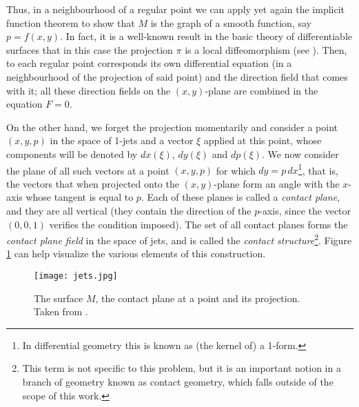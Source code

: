 Thus, in a neighbourhood of a regular point we can apply yet again the implicit function theorem to show that $M$ is the graph of a smooth function, say $p=f(x,y)$. In fact, it is a well-known result in the basic theory of differentiable surfaces that in this case the projection $\pi$ is a local diffeomorphism (see \cite[39]{montiel2009curves}). Then, to each regular point corresponds its own differential equation (in a neighbourhood of the projection of said point) and the direction field that comes with it; all these direction fields on the $(x,y)$-plane are combined in the equation $F=0$.

On the other hand, we forget the projection momentarily and consider a point $(x,y,p)$ in the space of 1-jets and a vector $\xi$ applied at this point, whose components will be denoted by $dx(\xi)$, $dy(\xi)$ and $dp(\xi)$. We now consider the plane of all such vectors at a point $(x,y,p)$ for which $dy=p\,dx$\footnote{In differential geometry this is known as (the kernel of) a 1-form.}, that is, the vectors that when projected onto the $(x,y)$-plane form an angle  with the $x$-axis whose tangent is equal to $p$. Each of these planes is called a \textit{contact plane}, and they are all vertical (they contain the direction of the $p$-axis, since the vector $(0,0,1)$ verifies the condition imposed). The set of all contact planes forms the \textit{contact plane field} in the space of jets, and is called the \textit{contact structure}\footnote{This term is not specific to this problem, but it is an important notion in a branch of geometry known as contact geometry, which falls outside of the scope of this work.}. Figure \ref{fig:jets} can help visualize the various elements of this construction.

\begin{figure}[h!]
\centering
\texttt{[image: jets.jpg]}
\caption{The surface $M$, the contact plane at a point and its projection. Taken from \cite{arnold2012geometrical}.}
\label{fig:jets}
\end{figure}

